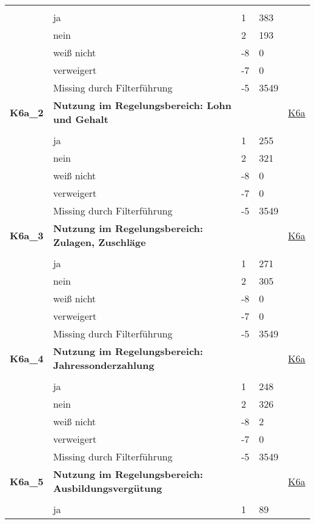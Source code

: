 \begin{longtable}{| L{2.5cm} | L{8.25cm}| C{1.5cm} | R{1.25cm} | C{2.25cm} |  }
   &  &  &  &  \\ 
   & ja & 1 & 383 &  \\ 
   & nein & 2 & 193 &  \\ 
   & weiß nicht & -8 & 0 &  \\ 
   & verweigert & -7 & 0 &  \\ 
   & Missing durch Filterführung & -5 & 3549 &  \\ 
   \midrule
\textbf{K6a\_2}\label{var:suf:K6a:2} & \textbf{Nutzung im Regelungsbereich: Lohn und Gehalt} &  &  & \hyperref[K6a]{K6a} \\ 
   &  &  &  &  \\ 
   & ja & 1 & 255 &  \\ 
   & nein & 2 & 321 &  \\ 
   & weiß nicht & -8 & 0 &  \\ 
   & verweigert & -7 & 0 &  \\ 
   & Missing durch Filterführung & -5 & 3549 &  \\ 
   \midrule
\textbf{K6a\_3}\label{var:suf:K6a:3} & \textbf{Nutzung im Regelungsbereich: Zulagen, Zuschläge} &  &  & \hyperref[K6a]{K6a} \\ 
   &  &  &  &  \\ 
   & ja & 1 & 271 &  \\ 
   & nein & 2 & 305 &  \\ 
   & weiß nicht & -8 & 0 &  \\ 
   & verweigert & -7 & 0 &  \\ 
   & Missing durch Filterführung & -5 & 3549 &  \\ 
   \midrule
\textbf{K6a\_4}\label{var:suf:K6a:4} & \textbf{Nutzung im Regelungsbereich: Jahressonderzahlung} &  &  & \hyperref[K6a]{K6a} \\ 
   &  &  &  &  \\ 
   & ja & 1 & 248 &  \\ 
   & nein & 2 & 326 &  \\ 
   & weiß nicht & -8 & 2 &  \\ 
   & verweigert & -7 & 0 &  \\ 
   & Missing durch Filterführung & -5 & 3549 &  \\ 
   \midrule
\textbf{K6a\_5}\label{var:suf:K6a:5} & \textbf{Nutzung im Regelungsbereich: Ausbildungsvergütung} &  &  & \hyperref[K6a]{K6a} \\ 
   &  &  &  &  \\ 
   & ja & 1 & 89 &  \\ 

\end{longtable}
